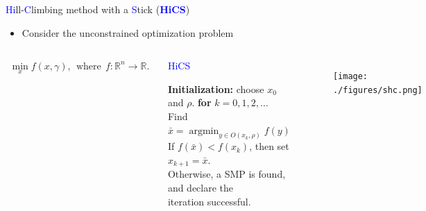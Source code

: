 \documentclass{beamer}
\DeclareMathOperator*{\argmin}{\mathrm{argmin}}
\begin{document}
\begin{frame}{\textcolor{blue}{Hi}ll-\textcolor{blue}{C}limbing
	method with a \textcolor{blue}{S}tick
	(\textcolor{blue}{\textbf{HiCS}})}

\begin{itemize}
	\item Consider the unconstrained optimization problem
\end{itemize}
\vspace{-0.3cm}
\begin{columns}[c]
	\column{8cm}
\begin{align*}
	\min_x f(x,\gamma),~~ \mbox{where}~~
f: \mathbb{R}^n \rightarrow \mathbb{R}.
\end{align*}
{\scriptsize
\begin{algorithm}[H]
	\caption{\textcolor{blue}{HiCS}}
	\label{alg:shc}
\begin{algorithmic}[1]
	\STATE \textbf{Initialization:} choose $x_0$ and $\rho$.
	\STATE \textbf{for} $k=0,1,2,\dots$
	\\
	\hspace{0.2cm} Find $\bar{x}=\argmin_{y\in O(x_k,\rho)} f(y)$
			\\
	\hspace{0.2cm} If $f(\bar x)<f(x_k)$, then set $x_{k+1}= \bar{x}$.
		  \\
		   \hspace{0.2cm} Otherwise, a SMP is found, and declare the
		   \\
		   \hspace{0.2cm}
		   iteration successful.
\end{algorithmic}
\end{algorithm}
}
	\column{3.5cm}
\begin{figure}[!htbp]
	\centering
	  \texttt{[image: ./figures/shc.png]}
\end{figure}
\end{columns}

\end{frame}
\end{document}
